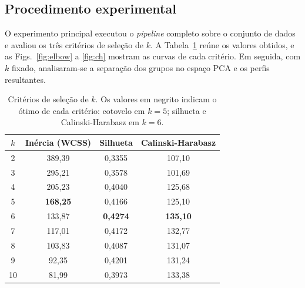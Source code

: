 \documentclass[conference]{IEEEtran}
\begin{document}
\subsection{Procedimento experimental}
O experimento principal executou o \textit{pipeline} completo sobre o conjunto de dados e avaliou os tr\^es crit\'erios de sele\c{c}\~ao de $k$. A Tabela~\ref{tab:crit} re\'une os valores obtidos, e as Figs.~\ref{fig:elbow} a \ref{fig:ch} mostram as curvas de cada crit\'erio. Em seguida, com $k$ fixado, analisaram-se a separa\c{c}\~ao dos grupos no espa\c{c}o PCA e os perfis resultantes.

\begin{table}[t]
\caption{Crit\'erios de sele\c{c}\~ao de $k$. Os valores em negrito indicam o \'otimo de cada crit\'erio: cotovelo em $k=5$; silhueta e Calinski-Harabasz em $k=6$.}
\label{tab:crit}
\centering
\small
\begin{tabular}{cccc}
\toprule
$k$ & In\'ercia (WCSS) & Silhueta & Calinski-Harabasz \\
\midrule
2 & 389{,}39 & 0{,}3355 & 107{,}10 \\
3 & 295{,}21 & 0{,}3578 & 101{,}69 \\
4 & 205{,}23 & 0{,}4040 & 125{,}68 \\
5 & \textbf{168{,}25} & 0{,}4166 & 125{,}10 \\
6 & 133{,}87 & \textbf{0{,}4274} & \textbf{135{,}10} \\
7 & 117{,}01 & 0{,}4172 & 132{,}77 \\
8 & 103{,}83 & 0{,}4087 & 131{,}07 \\
9 & 92{,}35 & 0{,}4201 & 131{,}24 \\
10 & 81{,}99 & 0{,}3973 & 133{,}38 \\
\bottomrule
\end{tabular}
\end{table}
\end{document}
